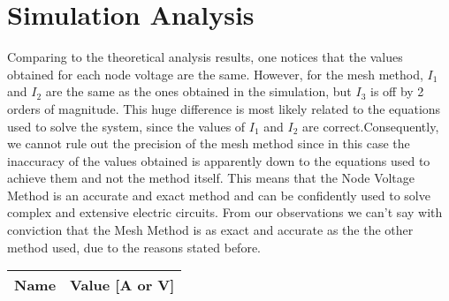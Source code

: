 \section{Simulation Analysis}
\label{sec:simulation}




\par Comparing to the theoretical analysis results, one notices that the values obtained for each node voltage are the same. However, for the mesh method, $I_1$ and $I_2$ are the same as the ones obtained in the simulation, but $I_3$ is off by 2 orders of magnitude. This huge difference is most likely related to the equations used to solve the system, since the values of $I_1$ and $I_2$ are correct.Consequently, we cannot rule out the precision of the mesh method since in this case the inaccuracy of the values obtained is apparently down to the equations used to achieve them and not the method itself. This means that the Node Voltage Method is an accurate and exact method and can be confidently used to solve complex and extensive electric circuits. From our observations we can't say with conviction that the Mesh Method is as exact and accurate as the the other method used, due to the reasons stated before. 

\begin{table}[h]
  \centering
  \begin{tabular}{|l|r|}
    \hline    
    {\bf Name} & {\bf Value [A or V]} \\ \hline
    
  \end{tabular}
  \label{tab:op}
\end{table}











